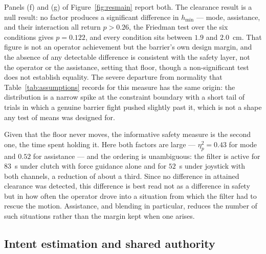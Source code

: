 \documentclass[12pt,a4paper,twoside,openright]{report}
\begin{document}
Panels (f) and (g) of Figure~\ref{fig:resmain} report both. The clearance result is a null result: no factor produces a significant difference in $h_{\min}$ --- mode, assistance, and their interaction all return $p > 0.26$, the Friedman test over the six conditions gives $p = 0.122$, and every condition sits between $1.9$ and $2.0$~cm. That figure is not an operator achievement but the barrier's own design margin, and the absence of any detectable difference is consistent with the safety layer, not the operator or the assistance, setting that floor, though a non-significant test does not establish equality. The severe departure from normality that Table~\ref{tab:assumptions} records for this measure has the same origin: the distribution is a narrow spike at the constraint boundary with a short tail of trials in which a genuine barrier fight pushed slightly past it, which is not a shape any test of means was designed for.

Given that the floor never moves, the informative safety measure is the second one, the time spent holding it. Here both factors are large --- $\eta^2_p = 0.43$ for mode and $0.52$ for assistance --- and the ordering is unambiguous: the filter is active for $83$~s under clutch with force guidance alone and for $52$~s under joystick with both channels, a reduction of about a third. Since no difference in attained clearance was detected, this difference is best read not as a difference in safety but in how often the operator drove into a situation from which the filter had to rescue the motion. Assistance, and blending in particular, reduces the number of such situations rather than the margin kept when one arises.



\subsection{Intent estimation and shared authority}
\label{sec:resauthority}
\end{document}
